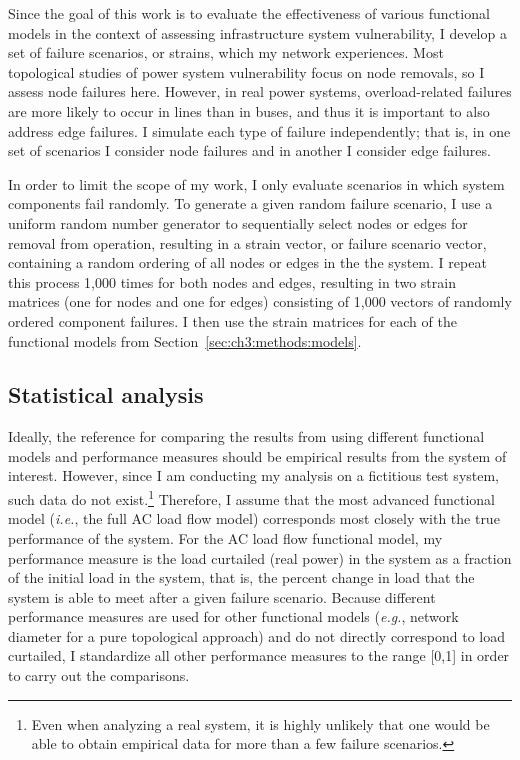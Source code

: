 Since the goal of this work is to evaluate the effectiveness of various functional models in the context of assessing infrastructure system vulnerability, I develop a set of failure scenarios, or strains, which my network experiences. Most topological studies of power system vulnerability focus on node removals, so I assess node failures here. However, in real power systems, overload-related failures are more likely to occur in lines than in buses, and thus it is important to also address edge failures. I simulate each type of failure independently; that is, in one set of scenarios I consider node failures and in another I consider edge failures.

In order to limit the scope of my work, I only evaluate scenarios in which system components fail randomly.  To generate a given random failure scenario, I use a uniform random number generator to sequentially select nodes or edges for removal from operation, resulting in a strain vector, or failure scenario vector, containing a random ordering of all nodes or edges in the the system. I repeat this process 1,000 times for both nodes and edges, resulting in two strain matrices (one for nodes and one for edges) consisting of 1,000 vectors of randomly ordered component failures. I then use the strain matrices for each of the functional models from Section~\ref{sec:ch3:methods:models}.


\subsection{Statistical analysis}
\label{sec:ch3:methods:stats}

Ideally, the reference for comparing the results from using different functional models and performance measures should be empirical results from the system of interest. However, since I am conducting my analysis on a fictitious test system, such data do not exist.\footnote[7]{Even when analyzing a real system, it is highly unlikely that one would be able to obtain empirical data for more than a few failure scenarios.}  Therefore, I assume that the most advanced functional model (\emph{i.e.}, the full AC load flow model) corresponds most closely with the true performance of the system. For the AC load flow functional model, my performance measure is the load curtailed (real power) in the system as a fraction of the initial load in the system, that is, the percent change in load that the system is able to meet after a given failure scenario. Because different performance measures are used for other functional models (\emph{e.g.}, network diameter for a pure topological approach) and do not directly correspond to load curtailed, I standardize all other performance measures to the range [0,1] in order to carry out the comparisons.

